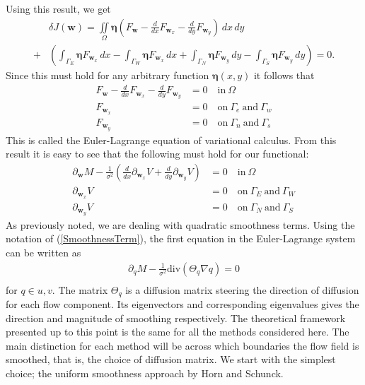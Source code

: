 Using this result, we get
\begin{align*}
&\delta J(\textbf{w}) = \iint \limits_{\Omega} \bm{\eta} \left( F_\textbf{w} -  \frac{d}{d x} F_{\textbf{w}_x} - \frac{d }{d y} F_{\textbf{w}_y} \right) \, dx \, dy  \\ 
+ & \left( \int_{\Gamma_{E}} \bm{\eta} F_{\textbf{w}_x} \, dx - \int_{\Gamma_{W}} \bm{\eta} F_{\textbf{w}_x} \, dx + \int_{\Gamma_{N}} \bm{\eta} F_{\textbf{w}_y} \, dy - \int_{\Gamma_{S}} \bm{\eta} F_{\textbf{w}_y} \, dy \right) = 0.
\end{align*}
Since this must hold for any arbitrary function $\bm{\eta}(x,y)$ it follows that
\begin{align*}
F_{\textbf{w}} - \frac{d}{dx} F_{\textbf{w}_x} - \frac{d }{d y} F_{\textbf{w}_y} &= 0 \quad \text{in} \ \Omega \\
F_{\textbf{w}_x} &= 0 \quad \text{on} \ \Gamma_e \ \text{and} \ \Gamma_w \\
F_{\textbf{w}_y}& = 0 \quad \text{on} \ \Gamma_n \ \text{and} \ \Gamma_s
\end{align*}
This is called the Euler-Lagrange equation of variational calculus. From this result it is easy to see that the following must hold for our functional:
\begin{equation}
\label{EL}
  \begin{aligned}
\partial_{\textbf{w}} M - \frac{1}{\sigma^2}\left( \frac{d}{d x} \partial_{\textbf{w}_x} V + \frac{d}{d y} \partial_{\textbf{w}_y} V \right) &= 0 \quad \text{in} \ \Omega  \\
\partial_{\textbf{w}_x} V &= 0 \quad \text{on} \ \Gamma_E \ \text{and} \ \Gamma_W \\
\partial_{\textbf{w}_y} V &= 0 \quad \text{on} \ \Gamma_N \ \text{and} \ \Gamma_S
  \end{aligned}
\end{equation}
As previously noted, we are dealing with quadratic smoothness terms. Using the notation of (\ref{SmoothnessTerm}), the first equation in the Euler-Lagrange system can be written as
\begin{equation}
\label{EL_regu}
  \begin{aligned}
\partial_q M - \frac{1}{\sigma^2} \text{div} \left(\Theta_q \nabla q \right) = 0 \\
	\end{aligned}
\end{equation}
for $q \in u, v$. The matrix $\Theta_q$ is a diffusion matrix steering the direction of diffusion for each flow component. Its eigenvectors and corresponding eigenvalues gives the direction and magnitude of smoothing respectively. The theoretical framework presented up to this point is the same for all the methods considered here. The main distinction for each method will be across which boundaries the flow field is smoothed, that is, the choice of diffusion matrix. We start with the simplest choice; the uniform smoothness approach by Horn and Schunck.
